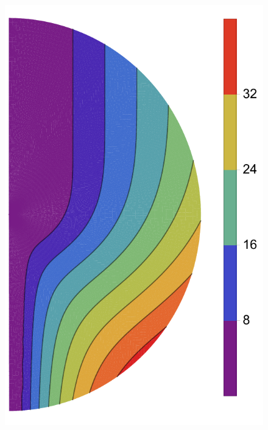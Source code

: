 \documentclass[extra,referee]{gji}
\begin{document}
\begin{figure}
  \centering
  \begin{minipage}{0.3\textwidth}
    \centering
    \includegraphics[width=\textwidth]{fig/nu24/ns.pdf}
  \end{minipage}\quad\quad\ %
  \begin{minipage}{0.3\textwidth}
    \centering

\end{minipage}
\end{figure}
\end{document}
